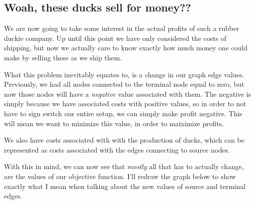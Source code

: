 \documentclass[11pt]{article}
\begin{document}
    \subsection{Woah, these ducks sell for money??}
    We are now going to take some interest in the actual profits of such a
    rubber duckie company. Up until this point we have only considered the
    costs of shipping, but now we actually care to know exactly how much money
    one could make by selling these as we ship them.

    What this problem inevitably equates to, is a change in our graph edge
    values. Previously, we had all nodes connected to the terminal node equal
    to zero, but now those nodes will have a \textit{negative} value associated
    with them. The negative is simply because we have associated costs with
    positive values, so in order to not have to sign switch our entire setup,
    we can simply make profit negative. This will mean we want to minimize this
    value, in order to maiximize profits.

    We also have costs associated with with the production of ducks, which can
    be represented as costs associated with the edges connecting to source
    nodes.

    With this in mind, we can now see that \textit{mostly} all that has to
    actually change, are the values of our objective function. I'll redraw the
    graph below to show exactly what I mean when talking about the new values
    of source and terminal edges.
    
\end{document}
